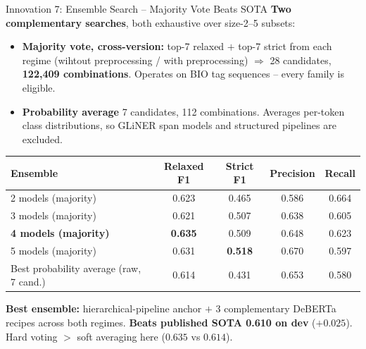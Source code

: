 \documentclass[aspectratio=169,10pt]{beamer}
\newcommand{\sota}{\textcolor{accent}{\textbf{0.610}}}
\newcommand{\ours}{\textcolor{good}{\textbf{0.635}}}
\begin{document}
\begin{frame}{Innovation 7: Ensemble Search -- Majority Vote Beats SOTA}
  \scriptsize
  \textbf{Two complementary searches}, both exhaustive over size-2--5 subsets:
  \begin{itemize}\setlength{\itemsep}{0pt}
    \item \textbf{Majority vote, cross-version:} top-7 relaxed $+$ top-7 strict from each regime (wihtout preprocessing / with preprocessing) $\Rightarrow$ 28 candidates, \textbf{122{,}409 combinations}. Operates on BIO tag sequences -- every family is eligible.
    \item \textbf{Probability average} 7 candidates, 112 combinations. Averages per-token class distributions, so GLiNER span models and structured pipelines are excluded.
  \end{itemize}

  \begin{center}\scriptsize
  \begin{tabular}{lcccc}
    \toprule
    Ensemble & Relaxed F1 & Strict F1 & Precision & Recall \\
    \midrule
    2 models (majority) & 0.623 & 0.465 & 0.586 & 0.664 \\
    3 models (majority) & 0.621 & 0.507 & 0.638 & 0.605 \\
    \rowcolor{good!15}
    \textbf{4 models (majority)} & \ours & 0.509 & 0.648 & 0.623 \\
    5 models (majority) & 0.631 & \textbf{0.518} & 0.670 & 0.597 \\
    \midrule
    Best probability average (raw, 7 cand.) & 0.614 & 0.431 & 0.653 & 0.580 \\
    \bottomrule
  \end{tabular}
  \end{center}
  \medskip

  \textbf{Best ensemble:} hierarchical-pipeline anchor $+$ 3 complementary DeBERTa recipes across both regimes. \textbf{Beats published SOTA \sota{} on dev} ($+0.025$). Hard voting $>$ soft averaging here ($0.635$ vs $0.614$).
\end{frame}
\end{document}
